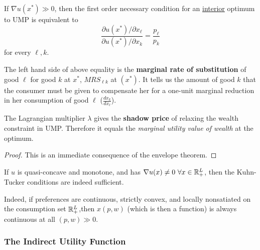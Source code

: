 \documentclass{report}
\begin{document}
 			\begin{corollary}
 				If $\nabla u\left(x^{*}\right) \gg 0$, then the first order necessary condition for an \ul{interior} optimum to UMP is equivalent to 
 				\begin{equation}
 					\frac{\partial u\left(x^{*}\right) / \partial x_{\ell}}{\partial u\left(x^{*}\right) / \partial x_{k}}=\frac{p_{\ell}}{p_{k}}
 				\end{equation}
 				for every $\ell, k$.
 			\end{corollary}
 			
 			\begin{definition}
 				The left hand side of above equality is the \textbf{marginal rate of substitution} of good $\ell$ for good $k$ at $x^*$, $MRS_{\ell k}$ at $(x^*)$. It tells us the amount of good $k$ that the consumer must be given to compensate her for a one-unit marginal reduction in her consumption of good $\ell$ ($\frac{dx_k}{dx_\ell}$).
 			\end{definition}
 			
 			\begin{proposition}
 				The Lagrangian multiplier $\lambda$ gives the \textbf{shadow price} of relaxing the wealth constraint in UMP. Therefore it equals the \emph{marginal utility value of wealth} at the optimum.
 			\end{proposition}
 			
 			\begin{proof}
 				This is an immediate consequence of the envelope theorem.
 			\end{proof}
 			
 			\begin{proposition}
 				If $u$ is quasi-concave and monotone, and has $\nabla u(x) \neq 0\ \forall x \in \mathbb{R}^L_+$, then the Kuhn-Tucker conditions are indeed sufficient.
 			\end{proposition}
 			
 			\begin{proposition}
 				Indeed, if preferences are continuous, strictly convex, and locally nonsatiated on the consumption set $\mathbb{R}^L_+$,then $x(p, w)$ (which is then a function) is always continuous at all $(p, w) \gg 0$.
 			\end{proposition}
 			
 			\subsubsection{The Indirect Utility Function}
 			
\end{document}
